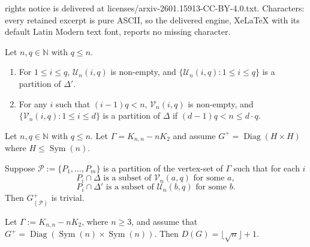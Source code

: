 \documentclass[10pt,a4paper]{amsart}
\DeclareMathOperator{\Diag}{Diag}
\DeclareMathOperator{\Sym}{Sym}
\newcommand{\N}{\mathbb{N}}
\begin{document}
rights notice is delivered at licenses/arxiv-2601.15913-CC-BY-4.0.txt. Characters: every retained excerpt is pure ASCII, so the delivered engine, XeLaTeX with its default Latin Modern text font, reports no missing character.
\begin{lemma}
\label{V is partition}
Let \(n,q \in \N\) with $q\leqslant n$.
\begin{enumerate}
    \item[(a)] For $1\leqslant i\leqslant q$, $\mathcal{U}_n(i,q)$ is non-empty, and \(
    \{\mathcal{U}_n(i, q) : 1 \leqslant i \leqslant q\}
\)
is a partition of $\Delta'$.
\item[(b)]  For any $i$ such that \((i-1)q < n\), $\mathcal{V}_n(i,q)$ is non-empty, and 
\(
    \{\mathcal{V}_n(i, q) : 1 \leqslant i \leqslant d\}
\)
is a partition of $\Delta$ if \((d-1)q<n\leqslant d \cdot q \).
\end{enumerate}
\end{lemma}

\begin{lemma}\label{lem:partsaresubsets}  Let \(n,q \in \N\) with $q\leqslant n$. Let $\Gamma=K_{n,n}-nK_2$ and assume  $G^+= \Diag(H\times H)$ where $H\leq\Sym(n)$. 

Suppose \(\mathcal{P}:=\{P_{1},\ldots, P_{m}\}\) is a partition of the vertex-set of $\Gamma$ %
such that for each $i$
\[P_i\cap\Delta\text{ is a subset of }\mathcal{V}_n(a, q)\text{ for some }a, \]
\[P_i\cap\Delta'\text{ is a subset of }\mathcal{U}_n(b, q)\text{ for some }b. \]
Then $G^+_{(\mathcal{P})}$ is trivial.    
\end{lemma}

\begin{proposition}\label{prop:DGdiag-Sym}
    Let \(\Gamma:=K_{n,n}-n K_2\), where $n\geqslant 3$, and assume that $G^+=\Diag(\Sym(n)\times \Sym(n))$.
    Then \(D(G)=\lfloor \sqrt{n}\rfloor+1\).
\end{proposition} 
\end{document}

